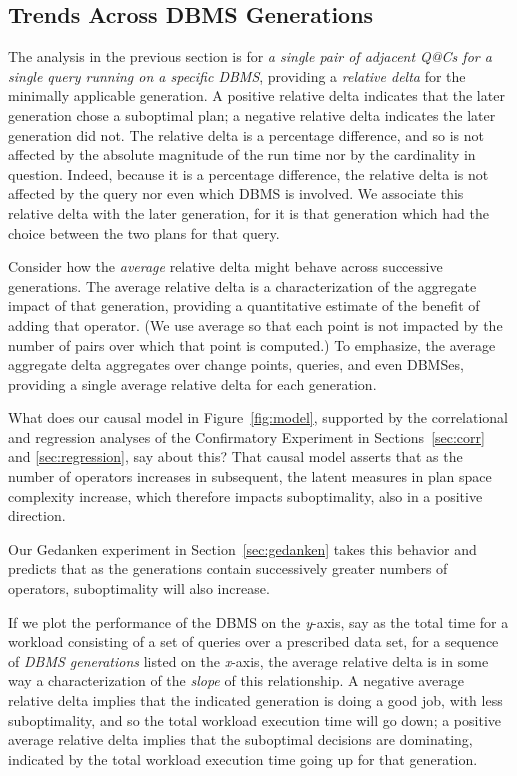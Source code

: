 \documentclass[prodmode,acmtods]{acmsmall}
\begin{document}
\subsection{Trends Across \hbox{DBMS} Generations}\label{sec:trends}
The analysis in the previous section is for {\em a single pair of adjacent Q@Cs for a single query
running on a specific \hbox{DBMS}},
providing a {\em relative delta} for the minimally \hbox{applicable} generation. A
positive relative delta indicates that the later generation chose a
suboptimal plan; a negative relative delta indicates the later generation
did not. The relative delta is a percentage difference, and so is not \hbox{affected}
by the absolute magnitude of the run time nor by the cardinality in
question. Indeed, because it is a percentage difference, the relative delta
is not affected by the query nor even which \hbox{DBMS} is involved. We associate
this relative delta with the later generation, for it is that generation
which had the choice between the two plans for that query.

Consider how the {\em average} relative delta might behave across successive
generations.
The average relative delta is a characterization of the aggregate
impact of that generation, providing a quantitative estimate of the benefit
of adding that operator. (We use average so that each point is not impacted
by the number of pairs over which that point is computed.)  To emphasize,
the average aggregate delta aggregates over change points, queries, and even
DBMSes, providing a single average relative delta for each generation.

What does our causal model in Figure~\ref{fig:model}, supported by the
correlational and regression analyses of the Confirmatory Experiment in
Sections~\ref{sec:corr} and \ref{sec:regression}, say about this? That
causal model asserts that as the number of operators increases in
subsequent, the latent measures in plan space complexity increase, which
therefore impacts suboptimality, also in a positive direction.

Our Gedanken experiment in
Section~\ref{sec:gedanken} takes this behavior and predicts that
as the generations contain successively greater numbers of
operators, suboptimality will also increase.

If we plot the performance of the DBMS on the {\em y}-axis, say as the
total time for a workload consisting of a set of queries over a
prescribed data set, for a sequence of {\em DBMS generations} listed on the
{\em x}-axis, the average relative delta is in some way a characterization
of the {\em slope} of this relationship. A negative average relative delta
implies that the indicated generation is doing a good job, with less
suboptimality, and so the total workload execution time will go down; a
positive average relative delta implies that the suboptimal decisions are
dominating, indicated by the total workload execution time going up for that
generation.
\end{document}
